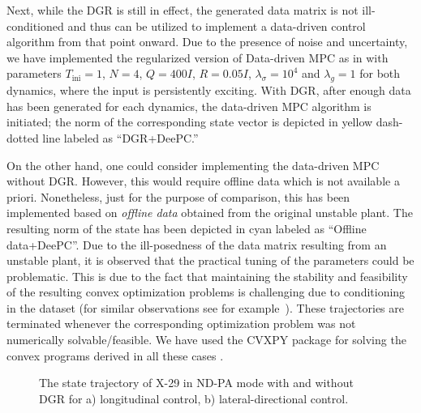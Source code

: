 \documentclass[journal]{IEEEtran}
\theoremstyle{definition}
\theoremstyle{remark}
\begin{document}
	{\color{PineGreen} Next, while the \ac{DGR} is still in effect, the generated data matrix is not ill-conditioned and thus can be utilized to implement a data-driven control algorithm from that point onward.
	Due to the presence of noise and uncertainty, we have implemented the regularized version of Data-driven \ac{MPC} as in \cite{coulson2019deepc, berberich2021data} with parameters $T_{\text{ini}} = 1$, $N=4$, $Q = 400 I$, $R = 0.05 I$, $\lambda_\sigma =10^4$ and $\lambda_g =1$ for both dynamics, where the input is persistently exciting.
	With \ac{DGR}, after enough data has been generated for each dynamics, the data-driven \ac{MPC} algorithm 
	is initiated; the norm of the corresponding state vector is depicted in yellow dash-dotted line labeled as ``\ac{DGR}+DeePC.''
	
	
	On the other hand, one could consider implementing the data-driven \ac{MPC} without DGR. {\color{PineGreen} However, this would require offline data which is not available a priori. Nonetheless, just for the purpose of comparison, this has been implemented based on {\em offline data} obtained from the original unstable plant. The resulting norm of the state has been depicted in cyan labeled as ``Offline data+DeePC''. Due to the ill-posedness of the data matrix resulting from an unstable plant, it is observed that the practical tuning of the parameters could be problematic. This is due to the fact that  maintaining the stability and feasibility of the resulting convex optimization problems is challenging due to conditioning in the dataset (for similar observations see for example~\cite{de2019formulas}). These trajectories are terminated whenever the corresponding optimization problem was not numerically solvable/feasible. We have used the CVXPY package for solving the convex programs derived in all these cases \cite{diamond2016cvxpy}.
	}}
	
	
    \begin{figure}[!t]
\centering
{}
\hfil
{}
\caption{The state trajectory of X-29 in ND-PA mode with and without \ac{DGR} for a)  longitudinal control, b) lateral-directional control.}
\label{fig:x-29-ND-PA}
\vspace{-0.3cm}
\end{figure}
\end{document}
